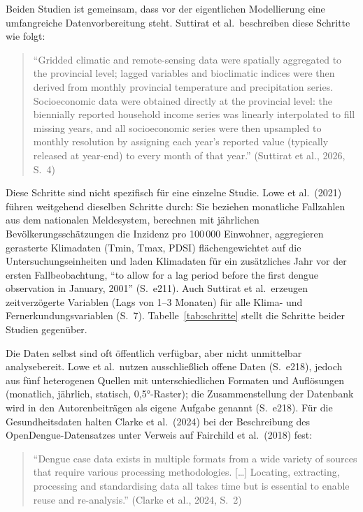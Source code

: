 \documentclass[11pt,a4paper]{article}
\begin{document}
Beiden Studien ist gemeinsam, dass vor der eigentlichen Modellierung eine
umfangreiche Datenvorbereitung steht. Suttirat et al.\ beschreiben diese
Schritte wie folgt:

\begin{quote}
\enquote{Gridded climatic and remote-sensing data were spatially aggregated to
the provincial level; lagged variables and bioclimatic indices were then derived
from monthly provincial temperature and precipitation series. Socioeconomic data
were obtained directly at the provincial level: the biennially reported household
income series was linearly interpolated to fill missing years, and all
socioeconomic series were then upsampled to monthly resolution by assigning each
year's reported value (typically released at year-end) to every month of that
year.} (Suttirat et al., 2026, S.~4)
\end{quote}

Diese Schritte sind nicht spezifisch für eine einzelne Studie. Lowe et al.\
(2021) führen weitgehend dieselben Schritte durch: Sie beziehen monatliche
Fallzahlen aus dem nationalen Meldesystem, berechnen mit jährlichen
Bevölkerungsschätzungen die Inzidenz pro 100\,000 Einwohner, aggregieren
gerasterte Klimadaten (Tmin, Tmax, PDSI) flächengewichtet auf die
Untersuchungseinheiten und laden Klimadaten für ein zusätzliches Jahr vor der
ersten Fallbeobachtung, \enquote{to allow for a lag period before the first
dengue observation in January, 2001} (S.~e211). Auch Suttirat et al.\ erzeugen
zeitverzögerte Variablen (Lags von 1--3 Monaten) für alle Klima- und
Fernerkundungsvariablen (S.~7). Tabelle~\ref{tab:schritte} stellt die Schritte
beider Studien gegenüber.

Die Daten selbst sind oft öffentlich verfügbar, aber nicht unmittelbar
analysebereit. Lowe et al.\ nutzen ausschließlich offene Daten (S.~e218), jedoch
aus fünf heterogenen Quellen mit unterschiedlichen Formaten und Auflösungen
(monatlich, jährlich, statisch, 0,5°-Raster); die Zusammenstellung der Datenbank
wird in den Autorenbeiträgen als eigene Aufgabe genannt (S.~e218). Für die
Gesundheitsdaten halten Clarke et al.\ (2024) bei der Beschreibung des
OpenDengue-Datensatzes unter Verweis auf Fairchild et al.\ (2018) fest:

\begin{quote}
\enquote{Dengue case data exists in multiple formats from a wide variety of
sources that require various processing methodologies. [\ldots] Locating,
extracting, processing and standardising data all takes time but is essential to
enable reuse and re-analysis.} (Clarke et al., 2024, S.~2)
\end{quote}
\end{document}
